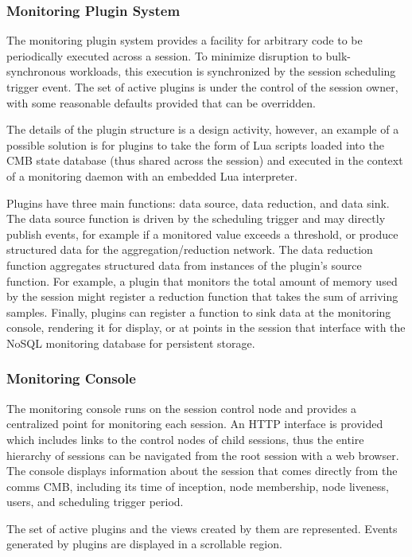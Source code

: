 \subsubsection{Monitoring Plugin System}

The monitoring plugin system provides a facility for arbitrary code to be
periodically executed across a session.  To minimize disruption to
bulk-synchronous workloads, this execution is synchronized by the 
session scheduling trigger event.  The set of active plugins is
under the control of the session owner, with some reasonable
defaults provided that can be overridden.

The details of the plugin structure is a design activity, however,
an example of a possible solution is for plugins to take the form of
Lua scripts loaded into the CMB state database
(thus shared across the session) and executed in the context of
a monitoring daemon with an embedded Lua interpreter.

Plugins have three main functions: data source, data reduction,
and data sink.  The data source function is driven by the scheduling
trigger and may directly publish events, for example if a monitored
value exceeds a threshold, or produce structured data for the
aggregation/reduction network.
The data reduction function aggregates structured data from instances
of the plugin's source function.
For example, a plugin that monitors the total amount of memory used
by the session might register a reduction function that takes the sum of
arriving samples.
Finally, plugins can register a function to sink data at the monitoring
console, rendering it for display, or at points in the session that interface
with the NoSQL monitoring database for persistent storage.

\subsubsection{Monitoring Console}

The monitoring console runs on the session control node and provides
a centralized point for monitoring each session.
An HTTP interface is provided which includes links to the control nodes
of child sessions, thus the entire hierarchy of sessions can be navigated
from the root session with a web browser.
The console displays information about the session that comes directly
from the comms CMB, including its time of inception, node membership,
node liveness, users, and scheduling trigger period.

The set of active plugins and the views created by them are represented.
Events generated by plugins are displayed in a scrollable region.

